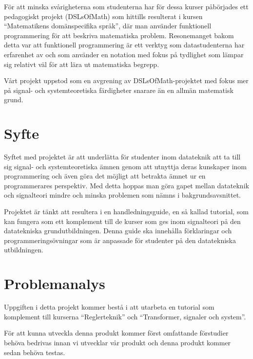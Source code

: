 \documentclass{article}
\begin{document}
För att minska svårigheterna som studenterna har för dessa kurser
påbörjades ett pedagogiskt projekt (DSLsOfMath) som hittills
resulterat i kursen “Matematikens domänspecifika språk”, där man
använder funktionell programmering för att beskriva matematiska problem. 
Resonemanget bakom detta var att funktionell programmering är ett
verktyg som datastudenterna har erfarenhet av och som använder en
notation med fokus på tydlighet som lämpar sig relativt väl för
att lära ut matematiska begrepp.

Vårt projekt uppstod som en avgrening av DSLsOfMath-projektet med
fokus mer på signal- och systemteoretiska färdigheter snarare än
en allmän matematisk grund.

\section{Syfte}
Syftet med projektet är att underlätta för studenter inom datateknik
att ta till sig signal- och systemteoretiska ämnen genom att utnyttja
deras kunskaper inom programmering och även göra det möjligt att
betrakta ämnet ur en programmerares perspektiv.
Med detta hoppas man göra gapet mellan datateknik och
signalteori mindre och minska problemen som nämns i
bakgrundsavsnittet.

Projektet är tänkt att resultera i en handledningsguide, en så kallad
tutorial, som kan fungera som ett komplement till de kurser som ges
inom signalteori på den datatekniska grundutbildningen. Denna guide ska innehålla förklaringar och programmeringsövningar som är anpassade för studenter på den datatekniska utbildningen.

\section{Problemanalys}
Uppgiften i detta projekt kommer bestå i att utarbeta en tutorial som
komplement till kurserna “Reglerteknik” och “Transformer, signaler och
system”.

För att kunna utveckla denna produkt kommer först omfattande
förstudier behöva bedrivas innan vi utvecklar vår produkt och denna
produkt kommer sedan behöva testas.
\end{document}
